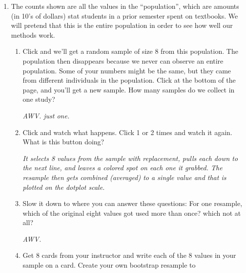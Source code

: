 \begin{enumerate}
  \item  The counts shown are all the values in the ``population'', which
    are amounts (in 10's of dollars) stat students in a prior semester
    spent on textbooks.  We will pretend that this is the entire
    population in order to see how well our methods work.
    \begin{enumerate}
    \item  Click  and we'll get a random sample of size
      8 from this population.  The population then disappears because
      we never can observe an entire population. Some of your numbers
      might be the same, but they came from different individuals in
      the population.  Click  at the bottom of
      the page, and you'll get a new sample.  How many samples do 
       we collect in one study?
\begin{students}
        \vspace{1cm}        
\end{students}
\begin{key}
   {\it AWV. just one. }
\end{key}
    \item  Click  and watch what happens. Click
       1 or 2 times and watch it again.  What is this
      button doing?
\begin{students}
        \vspace{1cm}        
\end{students}
\begin{key}
   {\it It selects 8 values from the sample with replacement, pulls
    each down to the next line, and leaves a colored spot on each one
    it grabbed.  The resample then gets combined (averaged) to a
    single value and that is plotted on the dotplot scale.}
\end{key}
    \item  Slow it down to where you can answer these questions: For
      one resample, which of the original eight values got used more
      than once? which not at all?
\begin{students}
        \vspace{1cm}        
\end{students}
\begin{key}
   {\it AWV.}
\end{key}
    \item Get 8 cards from your instructor and write each of the 8 values in
      your sample on a card.  Create your own bootstrap resample to

\end{enumerate}
\end{enumerate}

